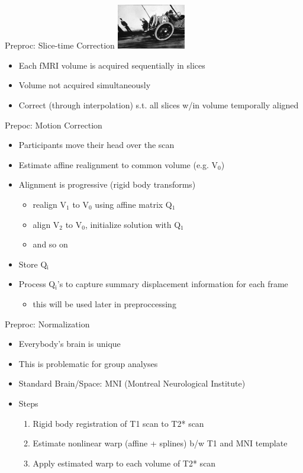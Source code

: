 \documentclass[presentation]{beamer}
\begin{document}
\begin{frame}[label={sec:orgheadline10}]{Preproc: Slice-time Correction}
\includegraphics[width=3cm]{./Figures/rollingshuttercar.jpg}
\begin{itemize}
\item Each fMRI volume is acquired sequentially in slices
\item Volume not acquired simultaneously
\item Correct (through interpolation) s.t. all slices w/in volume temporally aligned
\end{itemize}
\end{frame}
\begin{frame}[label={sec:orgheadline11}]{Prepoc: Motion Correction}
\begin{itemize}
\item Participants move their head over the scan
\item Estimate affine realignment to common volume (e.g. V\(_{\text{0}}\))
\item Alignment is progressive (rigid body transforms)
\begin{itemize}
\item realign V\(_{\text{1}}\) to V\(_{\text{0}}\) using affine matrix Q\(_{\text{1}}\)
\item align V\(_{\text{2}}\) to V\(_{\text{0}}\), initialize solution with Q\(_{\text{1}}\)
\item and so on
\end{itemize}
\item Store Q\(_{\text{i}}\)
\item Process Q\(_{\text{i}}\)'s to capture summary displacement information for each frame
\begin{itemize}
\item this will be used later in preproccessing
\end{itemize}
\end{itemize}
\end{frame}
\begin{frame}[label={sec:orgheadline12}]{Preproc: Normalization}
\begin{itemize}
\item Everybody's brain is unique
\item This is problematic for group analyses
\item Standard Brain/Space: MNI (Montreal Neurological Institute)
\item Steps
\begin{enumerate}
\item Rigid body registration of T1 scan to T2* scan
\item Estimate nonlinear warp (affine + splines) b/w T1 and MNI template
\item Apply estimated warp to each volume of T2* scan
\end{enumerate}
\end{itemize}
\end{frame}
\end{document}
